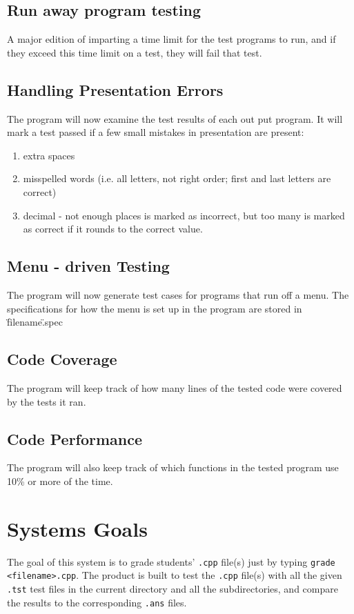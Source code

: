 \subsection{Run away program testing}
A major edition of imparting a time limit for the test programs to run, and if they exceed this time limit on a test, they will fail that test.

\newpage
\subsection{Handling Presentation Errors}
The program will now examine the test results of each out put program. It will mark a test passed if a few small mistakes in presentation are present:
\begin{enumerate}
\item extra spaces
\item misspelled words (i.e. all letters, not right order; first and last letters are correct)
\item decimal - not enough places is marked as incorrect, but too many is marked as correct if it rounds to the correct value.
\end{enumerate}

\subsection{Menu - driven Testing}
The program will now generate test cases for programs that run off a menu. The specifications for
how the menu is set up in the program are stored in \"filename\".spec

\subsection{Code Coverage}
The program will keep track of how many lines of the tested code were covered by the tests it ran.

\subsection{Code Performance}
The program will also keep track of which functions in the tested program use 10\% or more of the time.

\section{Systems Goals}
The goal of this system is to grade students' {\tt .cpp} file(s) just by typing {\tt grade <filename>.cpp}. The product is built to test the {\tt .cpp} file(s) with all the given {\tt .tst} test files in the current directory and all the subdirectories, and compare the results to the corresponding {\tt .ans} files.

